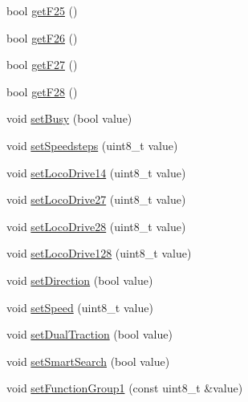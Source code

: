 \begin{DoxyCompactItemize}
bool \hyperlink{classTBT_1_1LocDecoder_a3e06e61df29ee70660c003cbe81cb497_a3e06e61df29ee70660c003cbe81cb497}{get\+F25} ()
\item 
bool \hyperlink{classTBT_1_1LocDecoder_aa240dc8548525b91d931eed9cd549657_aa240dc8548525b91d931eed9cd549657}{get\+F26} ()
\item 
bool \hyperlink{classTBT_1_1LocDecoder_a0f8abd84b95094b2a139bd3402153aae_a0f8abd84b95094b2a139bd3402153aae}{get\+F27} ()
\item 
bool \hyperlink{classTBT_1_1LocDecoder_aecb2127b4edc17aac10dda93b4404e1d_aecb2127b4edc17aac10dda93b4404e1d}{get\+F28} ()
\item 
void \hyperlink{classTBT_1_1LocDecoder_ac8f62e05b5ea28dcbaf1c07a1c4a91ec_ac8f62e05b5ea28dcbaf1c07a1c4a91ec}{set\+Busy} (bool value)
\item 
void \hyperlink{classTBT_1_1LocDecoder_aa919a313cb33a49d792694a544f2d3de_aa919a313cb33a49d792694a544f2d3de}{set\+Speedsteps} (uint8\+\_\+t value)
\item 
void \hyperlink{classTBT_1_1LocDecoder_a5b0ba8089edaf920fb513e26701580bf_a5b0ba8089edaf920fb513e26701580bf}{set\+Loco\+Drive14} (uint8\+\_\+t value)
\item 
void \hyperlink{classTBT_1_1LocDecoder_ace59dd8679514643328ce916057669e4_ace59dd8679514643328ce916057669e4}{set\+Loco\+Drive27} (uint8\+\_\+t value)
\item 
void \hyperlink{classTBT_1_1LocDecoder_a6bbf6c173217c49b7d4909b9c4cb5127_a6bbf6c173217c49b7d4909b9c4cb5127}{set\+Loco\+Drive28} (uint8\+\_\+t value)
\item 
void \hyperlink{classTBT_1_1LocDecoder_a9de246d419829f424e8b50c817c599ca_a9de246d419829f424e8b50c817c599ca}{set\+Loco\+Drive128} (uint8\+\_\+t value)
\item 
void \hyperlink{classTBT_1_1LocDecoder_a7e5a054cecfa15cc2574b166c2001deb_a7e5a054cecfa15cc2574b166c2001deb}{set\+Direction} (bool value)
\item 
void \hyperlink{classTBT_1_1LocDecoder_afa7b68a8e717065e39c80a83cbd9bb66_afa7b68a8e717065e39c80a83cbd9bb66}{set\+Speed} (uint8\+\_\+t value)
\item 
void \hyperlink{classTBT_1_1LocDecoder_a1dbc0fcca21619d0283e1a61bbb1f7b2_a1dbc0fcca21619d0283e1a61bbb1f7b2}{set\+Dual\+Traction} (bool value)
\item 
void \hyperlink{classTBT_1_1LocDecoder_ab17b176f9fb53af19911611dc35c4e76_ab17b176f9fb53af19911611dc35c4e76}{set\+Smart\+Search} (bool value)
\item 
void \hyperlink{classTBT_1_1LocDecoder_a7d77fa29a27f1abff7dba21c3cca7ff1_a7d77fa29a27f1abff7dba21c3cca7ff1}{set\+Function\+Group1} (const uint8\+\_\+t \&value)

\end{DoxyCompactItemize}
